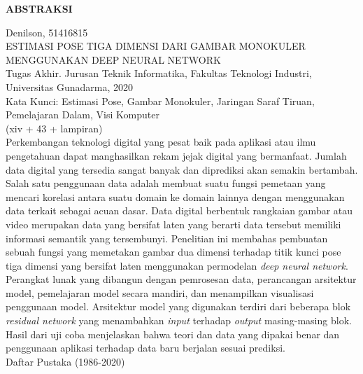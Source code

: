 \newpage %
\begin{center}
    \begin{large}\textbf{ABSTRAKSI}\end{large}
\end{center}

\vspace{5mm}

\noindent Denilson, 51416815 \\
ESTIMASI POSE TIGA DIMENSI DARI GAMBAR MONOKULER MENGGUNAKAN DEEP NEURAL NETWORK\\
Tugas Akhir. Jurusan Teknik Informatika, Fakultas Teknologi Industri, \\
Universitas Gunadarma, 2020\\
Kata Kunci: Estimasi Pose, Gambar Monokuler, Jaringan Saraf Tiruan, Pemelajaran Dalam, Visi Komputer\\
\noindent (xiv + 43 + lampiran)\\

Perkembangan teknologi digital yang pesat baik pada aplikasi atau ilmu pengetahuan dapat
manghasilkan rekam jejak digital yang bermanfaat. Jumlah data digital yang tersedia sangat
banyak dan diprediksi akan semakin bertambah. Salah satu penggunaan data adalah membuat
suatu fungsi pemetaan yang mencari korelasi antara suatu domain ke domain lainnya dengan
menggunakan data terkait sebagai acuan dasar. Data digital berbentuk rangkaian gambar atau video
merupakan data yang bersifat laten yang berarti data tersebut memiliki informasi semantik yang
tersembunyi. Penelitian ini membahas pembuatan sebuah fungsi yang memetakan gambar dua dimensi
terhadap titik kunci pose tiga dimensi yang bersifat laten menggunakan permodelan
\textit{deep neural network}. Perangkat lunak yang dibangun dengan pemrosesan data,
perancangan arsitektur model, pemelajaran model secara mandiri, dan menampilkan visualisasi
penggunaan model. Arsitektur model yang digunakan terdiri dari beberapa blok \textit{residual network}
yang menambahkan \textit{input} terhadap \textit{output} masing-masing blok. Hasil dari uji coba menjelaskan
bahwa teori dan data yang dipakai benar dan penggunaan aplikasi terhadap data baru berjalan
sesuai prediksi.\\


\noindent Daftar Pustaka (1986-2020)
